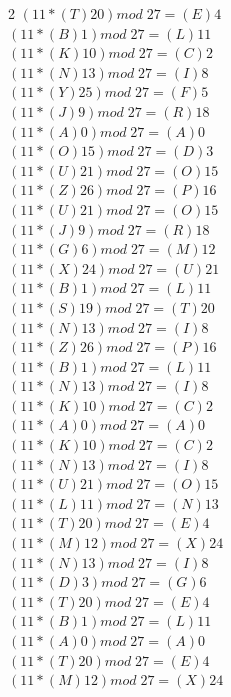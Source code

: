 \documentclass{article}
\begin{document}
\begin{enumerate}
\begin{multicols}{2}
$(11 * (T)20) mod \; 27= (E) 4 $\\
$(11 * (B)1) mod \; 27= (L)11 $\\
$(11 * (K)10) mod \; 27= (C)2 $\\
$(11 * (N)13) mod \; 27= (I)8 $\\
$(11 * (Y)25) mod \; 27= (F)5 $\\
$(11 * (J)9) mod \; 27= (R)18 $\\
$(11 * (A)0) mod \; 27= (A)0 $\\
$(11 * (O)15) mod \; 27= (D)3 $\\
$(11 * (U)21) mod \; 27= (O)15 $\\
$(11 * (Z)26) mod \; 27= (P)16 $\\
$(11 * (U)21) mod \; 27= (O)15 $\\
$(11 * (J)9) mod \; 27= (R)18 $\\
$(11 * (G)6) mod \; 27= (M)12 $\\
$(11 * (X)24) mod \; 27= (U)21 $\\
$(11 * (B)1) mod \; 27= (L)11 $\\
$(11 * (S)19) mod \; 27= (T)20 $\\
$(11 * (N)13) mod \; 27= (I)8 $\\
$(11 * (Z)26) mod \; 27= (P)16 $\\
$(11 * (B)1) mod \; 27= (L)11 $\\
$(11 * (N)13) mod \; 27= (I)8 $\\
$(11 * (K)10) mod \; 27= (C)2 $\\
$(11 * (A)0) mod \; 27= (A)0 $\\
$(11 * (K)10) mod \; 27= (C)2 $\\
$(11 * (N)13) mod \; 27= (I)8 $\\
$(11 * (U)21) mod \; 27= (O)15 $\\
$(11 * (L)11) mod \; 27= (N)13 $\\
$(11 * (T)20) mod \; 27= (E) 4 $\\
$(11 * (M)12) mod \; 27= (X) 24 $\\
$(11 * (N)13) mod \; 27= (I)8 $\\
$(11 * (D)3) mod \; 27= (G)6 $\\
$(11 * (T)20) mod \; 27= (E) 4 $\\
$(11 * (B)1) mod \; 27= (L)11 $\\
$(11 * (A)0) mod \; 27= (A)0 $\\
$(11 * (T)20) mod \; 27= (E) 4 $\\
$(11 * (M)12) mod \; 27= (X) 24 $\\

\end{multicols}
\end{enumerate}
\end{document}
